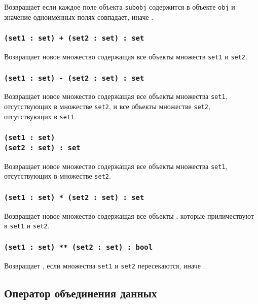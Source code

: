 Возвращает \false{} если каждое поле объекта \texttt{subobj} содержится в объекте \texttt{obj} и значение одноимённых полях совпадает, иначе \true{}.

\subsubsection{\texttt{(set1 : set) + (set2 : set) : set}}

Возвращает новое множество содержащая все объекты множеств \texttt{set1} и \texttt{set2}.

\subsubsection{\texttt{(set1 : set) - (set2 : set) : set}}

Возвращает новое множество содержащая все объекты множества \texttt{set1}, отсутствующих в множестве \texttt{set2}, и все объекты множестве \texttt{set2}, отсутствующих в \texttt{set1}.

\subsubsection{\texttt{(set1 : set) \\ (set2 : set) : set}}

Возвращает новое множество содержащая все объекты множества \texttt{set1}, отсутствующих в множестве \texttt{set2}.

\subsubsection{\texttt{(set1 : set) * (set2 : set) : set}}

Возвращает новое множество содержащая все объекты , которые приличествуют в \texttt{set1} и \texttt{set2}.

\subsubsection{\texttt{(set1 : set) ** (set2 : set) : bool}}

Возвращает \true, если множества \texttt{set1} и \texttt{set2} пересекаются, иначе \false.

\subsection{Оператор объединения данных}

